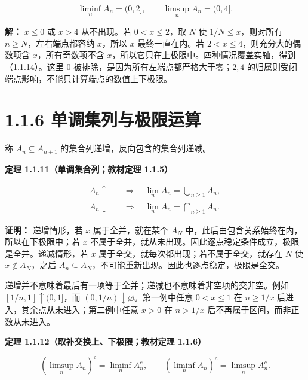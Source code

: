 \documentclass[11pt,a4paper]{article}
\begin{document}
\begin{equation*}
\liminf_n A_n=(0,2],\qquad \limsup_n A_n=(0,4].
\tag{1.1.14}
\end{equation*}

\textbf{解：} \(x\le0\) 或 \(x>4\) 从不出现。若 \(0<x\le2\)，取 \(N\) 使
\(1/N\le x\)，则对所有 \(n\ge N\)，左右端点都容纳 \(x\)，所以 \(x\)
最终一直在内。若 \(2<x\le4\)，则充分大的偶数项含 \(x\)，所有奇数项不含
\(x\)，所以它只在上极限中。四种情况覆盖实轴，得到（1.1.14）。这里 \(0\)
被排除，是因为所有左端点都严格大于零；\(2,4\)
的归属则受闭端点影响，不能只计算端点的数值上下极限。

\section[\S{}1.1.6
单调集列与极限运算]{1.1.6
单调集列与极限运算}\label{ux5355ux8c03ux96c6ux5217ux4e0eux6781ux9650ux8fd0ux7b97}

称 \(A_n\subseteq A_{n+1}\) 的集合列递增，反向包含的集合列递减。

\textbf{定理 1.1.11（单调集合列；教材定理 1.1.5）}

\begin{equation*}
\begin{aligned}
A_n\uparrow&\quad\Longrightarrow\quad\lim_n A_n=\bigcup_{n\ge1}A_n,\\
A_n\downarrow&\quad\Longrightarrow\quad\lim_n A_n=\bigcap_{n\ge1}A_n.
\end{aligned}\tag{1.1.15}
\end{equation*}

\textbf{证明：} 递增情形，若 \(x\) 属于全并，就在某个 \(A_N\)
中，此后由包含关系始终在内，所以在下极限中；若 \(x\)
不属于全并，就从未出现。因此逐点稳定条件成立，极限是全并。递减情形，若
\(x\) 属于全交，就每次都出现；若不属于全交，就存在 \(N\) 使
\(x\notin A_N\)，之后
\(A_n\subseteq A_N\)，不可能重新出现。因此也逐点稳定，极限是全交。

递增并不意味着最后有一项等于全并；递减也不意味着非空项的交非空。例如
\([1/n,1]\uparrow(0,1]\)，而
\((0,1/n)\downarrow\varnothing\)。第一例中任意 \(0<x\le1\) 在
\(n\ge1/x\) 后进入，其余点从未进入；第二例中任意 \(x>0\) 在 \(n>1/x\)
后不再属于区间，而非正数从未进入。

\textbf{定理 1.1.12（取补交换上、下极限；教材定理 1.1.6）}

\begin{equation*}
(\limsup_n A_n)^c=\liminf_n A_n^c,
\qquad
(\liminf_n A_n)^c=\limsup_n A_n^c.
\tag{1.1.16}
\end{equation*}
\end{document}
